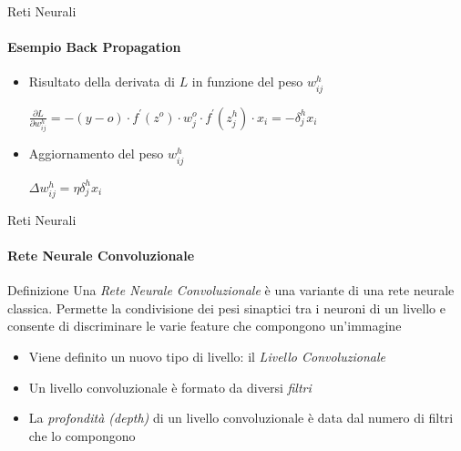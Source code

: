 \documentclass[
 ]{beamer}
\begin{document}
\begin{frame}{Reti Neurali}
    \framesubtitle{Esempio Back Propagation}
    \begin{itemize} [<+->]
        \setlength\itemsep{3em}
        \item \large Risultato della derivata di $L$ in funzione del peso $w_{ij}^{h}$
        \bigskip 
        \begin{center}
         \large $ \frac{\partial L}{\partial w_{ij}^{h}} =  -(y - o) \cdot f^{\prime}(z^{o}) \cdot w_j^{o} \cdot f^{\prime}(z_j^{h}) \cdot x_i = -\delta_j^{h}x_i$         
         \end{center}
         \item \large Aggiornamento del peso $w_{ij}^{h}$
         \bigskip
         \begin{center}
         \large $ \Delta w_{ij}^{h} = \eta\delta_j^{h}x_i$         
         \end{center}       
    \end{itemize}
\end{frame}

\begin{frame}{Reti Neurali}
    \framesubtitle{Rete Neurale Convoluzionale}
    
    \begin{block}{Definizione}  
    Una \emph{Rete Neurale Convoluzionale} è una variante di una rete neurale classica. Permette la condivisione dei pesi sinaptici tra i neuroni di un livello e consente di discriminare le varie feature che compongono un'immagine
    \end{block}\pause
    
    \bigskip
    
    \begin{itemize} [<+->]
        \setlength\itemsep{1em}
        \item \large Viene definito un nuovo tipo di livello: il \emph{Livello Convoluzionale}
        \item \large Un livello convoluzionale è formato da diversi \emph{filtri}
        \item \large La \emph{profondità (depth)} di un livello convoluzionale è data dal numero di filtri che lo compongono
    \end{itemize}    
\end{frame}
\end{document}

